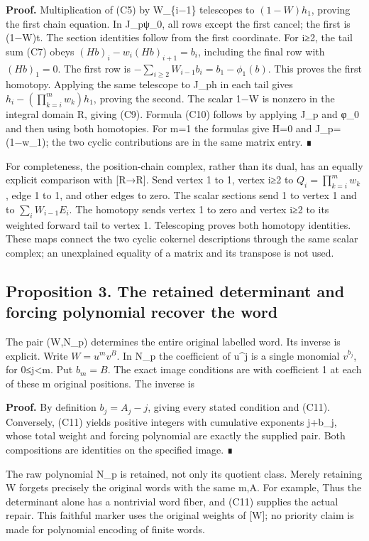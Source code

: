 \textbf{Proof.} Multiplication of (C5) by W\_\{i−1\} telescopes to
\((1-W)h_1\), proving the first chain equation. In J\_pψ\_0, all rows
except the first cancel; the first is (1−W)t. The section identities
follow from the first coordinate. For i≥2, the tail sum (C7) obeys
\((Hb)_i-w_i(Hb)_{i+1}=b_i\), including the final row with \((Hb)_1=0\).
The first row is \(-\sum_{i\ge2}W_{i-1}b_i=b_1-\phi_1(b)\). This proves
the first homotopy. Applying the same telescope to J\_ph in each tail
gives \(h_i-(\prod_{k=i}^m w_k)h_1\), proving the second. The scalar 1−W
is nonzero in the integral domain R, giving (C9). Formula (C10) follows
by applying J\_p and φ\_0 and then using both homotopies. For m=1 the
formulas give H=0 and J\_p=(1−w\_1); the two cyclic contributions are in
the same matrix entry. ∎

For completeness, the position-chain complex, rather than its dual, has
an equally explicit comparison with {[}R→R{]}. Send vertex 1 to 1,
vertex i≥2 to \(Q_i=\prod_{k=i}^m w_k\), edge 1 to 1, and other edges to
zero. The scalar sections send 1 to vertex 1 and to
\(\sum_iW_{i-1}E_i\). The homotopy sends vertex 1 to zero and vertex i≥2
to its weighted forward tail to vertex 1. Telescoping proves both
homotopy identities. These maps connect the two cyclic cokernel
descriptions through the same scalar complex; an unexplained equality of
a matrix and its transpose is not used.

\subsection{Proposition 3. The retained determinant and forcing
polynomial recover the word}

The pair (W,N\_p) determines the entire original labelled word. Its
inverse is explicit. Write \(W=u^m v^B\). In N\_p the coefficient of
u\^{}j is a single monomial \(v^{b_j}\), for 0≤j\textless m. Put
\(b_m=B\). The exact image conditions are
 with
coefficient 1 at each of these m original positions. The inverse is

\textbf{Proof.} By definition \(b_j=A_j-j\), giving every stated
condition and (C11). Conversely, (C11) yields positive integers with
cumulative exponents j+b\_j, whose total weight and forcing polynomial
are exactly the supplied pair. Both compositions are identities on the
specified image. ∎

The raw polynomial N\_p is retained, not only its quotient class. Merely
retaining W forgets precisely the original words with the same m,A. For
example,  Thus the determinant
alone has a nontrivial word fiber, and (C11) supplies the actual repair.
This faithful marker uses the original weights of {[}W{]}; no priority
claim is made for polynomial encoding of finite words.

